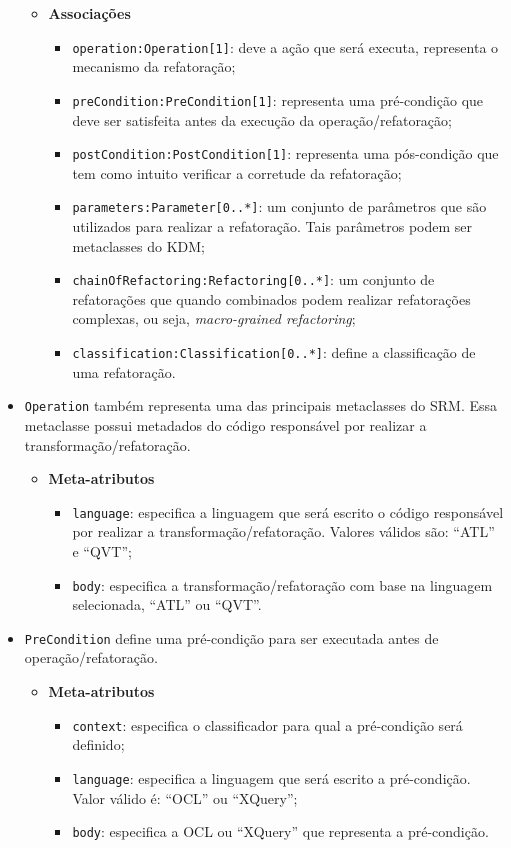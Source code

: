 \begin{itemize}
\begin{itemize}
	\item \textbf{Associações}
		\begin{itemize}
			\item \texttt{operation:Operation[1]}: deve a ação que será executa, representa o mecanismo da refatoração;
			\item \texttt{preCondition:PreCondition[1]}: representa uma pré-condição que deve ser satisfeita antes da execução da operação/refatoração;
			\item \texttt{postCondition:PostCondition[1]}: representa uma pós-condição que tem como intuito verificar a corretude da refatoração;
			\item \texttt{parameters:Parameter[0..*]}: um conjunto de parâmetros que são utilizados para realizar a refatoração. Tais parâmetros podem ser metaclasses do KDM;
			\item \texttt{chainOfRefactoring:Refactoring[0..*]}: um conjunto de refatorações que quando combinados podem realizar refatorações complexas, ou seja, \textit{macro-grained refactoring};
			\item \texttt{classification:Classification[0..*]}: define a classificação de uma refatoração.
		\end{itemize}	
\end{itemize} 

\item \texttt{Operation} também representa uma das principais metaclasses do SRM. Essa metaclasse possui metadados do código responsável por realizar a transformação/refatoração.

\begin{itemize}
	\item \textbf{Meta-atributos}
		\begin{itemize}
			\item \texttt{language}: especifica a linguagem que será escrito o código responsável por realizar a transformação/refatoração. Valores válidos são: ``ATL'' e ``QVT'';
			\item \texttt{body}: especifica a transformação/refatoração com base na linguagem selecionada, ``ATL'' ou ``QVT''.
		\end{itemize}	
\end{itemize} 

\item \texttt{PreCondition} define uma pré-condição para ser executada antes de operação/refatoração.

\begin{itemize}
	\item \textbf{Meta-atributos}
		\begin{itemize}
			\item \texttt{context}: especifica o classificador para qual a pré-condição será definido;
			\item \texttt{language}: especifica a linguagem que será escrito a pré-condição. Valor válido é: ``OCL'' ou ``XQuery'';
			\item \texttt{body}: especifica a OCL ou ``XQuery'' que representa a pré-condição.
		\end{itemize}	
\end{itemize} 


\end{itemize}

